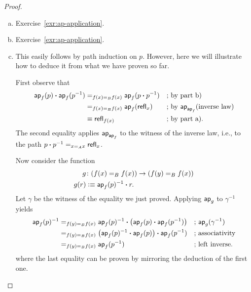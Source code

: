 \begin{proof}${}$
    \begin{enumerate}[a)]
        \item Exercise~\ref{exr:ap-application}.
        \item Exercise~\ref{exr:ap-application}.
        
        \item This easily follows by path induction on $p$. However, here we will illustrate how to deduce it from what we have proven so far.
        
        First observe that
        \begin{align*}
            \mathsf{ap}_f(p)\mathbin{\boldsymbol{\cdot}}\mathsf{ap}_f(p^{-1})
                &\mathrel{=_{f(x)\mathrel{=_{B}}f(x)}}\mathsf{ap}_f(p\mathbin{\boldsymbol{\cdot}} p^{-1})
                    &&\text{; by part b)}\\
                &\mathrel{=_{f(x)\mathrel{=_{B}}f(x)}}\mathsf{ap}_f(\mathsf{refl}_x)
                    &&\text{; by } \mathsf{ap}_{\mathsf{ap}_f}(\text{inverse law})\\
                &\equiv\mathsf{refl}_{f(x)}
                    &&\text{; by part a).}
        \end{align*}
        The second equality applies $\mathsf{ap}_{\mathsf{ap}_f}$ to the witness of the inverse law, i.e., to the path $p\mathbin{\boldsymbol{\cdot}} p^{-1}\mathrel{=_{x\mathrel{=_{A}}x}}\mathsf{refl}_x$.
    
        Now consider the function
        \begin{align*}
            g &\colon (f(x)\eq Bf(x)) \to (f(y)\eq Bf(x)) \\
            g(r) &\defeq \fun{ap}_f(p)^{-1}\ct r.
        \end{align*}
        Let $\gamma$ be the witness of the equality we just proved. Applying $\mathsf{ap}_g$ to $\gamma^{-1}$ yields
        \begin{align*}
            \mathsf{ap}_f(p)^{-1}
                &\mathrel{=_{f(y)\mathrel{=_{B}}f(x)}} \mathsf{ap}_f(p)^{-1}\mathbin{\boldsymbol{\cdot}}\big(\mathsf{ap}_f(p) \mathbin{\boldsymbol{\cdot}}\mathsf{ap}_f(p^{-1})\big)
                    &&\text{; }\mathsf{ap}_g(\gamma^{-1})\\
                &\mathrel{=_{f(y)\mathrel{=_{B}}f(x)}} \big(\mathsf{ap}_f(p)^{-1}\mathbin{\boldsymbol{\cdot}}\mathsf{ap}_f(p)\big) \mathbin{\boldsymbol{\cdot}}\mathsf{ap}_f(p^{-1})
                    &&\text{; associativity}\\
                &\mathrel{=_{f(y)\mathrel{=_{B}}f(x)}}\mathsf{ap}_f(p^{-1})
                    &&\text{; left inverse.}
        \end{align*}
        where the last equality can be proven by mirroring the deduction of the first one.


\end{enumerate}
\end{proof}
